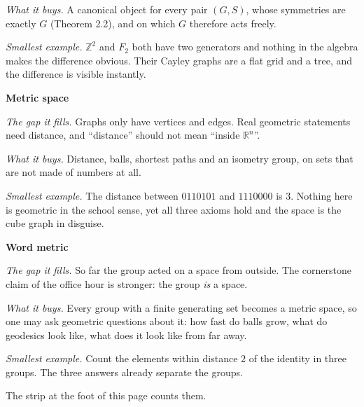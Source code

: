 \documentclass[10pt]{article}
\newcommand{\Z}{\mathbb{Z}}
\newcommand{\R}{\mathbb{R}}
\begin{document}
{\begin{minipage}[t]{744pt}
\begin{minipage}[t]{238pt}
\emph{What it buys.} A canonical object for every pair $(G,S)$, whose symmetries are exactly $G$ (Theorem 2.2), and on which $G$ therefore acts freely.\par\vspace{1pt}
\emph{Smallest example.} $\Z^2$ and $F_2$ both have two generators and nothing in the algebra makes the difference obvious. Their Cayley graphs are a flat grid and a tree, and the difference is visible instantly.\par\vspace{5pt}
{\sffamily\bfseries\color{big} Metric space}\par\vspace{1pt}
\emph{The gap it fills.} Graphs only have vertices and edges. Real geometric statements need distance, and ``distance'' should not mean ``inside $\R^n$''.\par\vspace{1pt}
\emph{What it buys.} Distance, balls, shortest paths and an isometry group, on sets that are not made of numbers at all.\par\vspace{1pt}
\emph{Smallest example.} The distance between $0110101$ and $1110000$ is $3$. Nothing here is geometric in the school sense, yet all three axioms hold and the space is the cube graph in disguise.
\end{minipage}\hfill
\begin{minipage}[t]{238pt}\vspace{0pt}
{\sffamily\bfseries\color{big} Word metric}\par\vspace{1pt}
\emph{The gap it fills.} So far the group acted on a space from outside. The cornerstone claim of the office hour is stronger: the group \emph{is} a space.\par\vspace{1pt}
\emph{What it buys.} Every group with a finite generating set becomes a metric space, so one may ask geometric questions about it: how fast do balls grow, what do geodesics look like, what does it look like from far away.\par\vspace{1pt}
\emph{Smallest example.} Count the elements within distance $2$ of the identity in three groups. The three answers already separate the groups.\par\vspace{2pt}
The strip at the foot of this page counts them.\par\vspace{1pt}

\end{minipage}
\end{minipage}}
\end{document}
